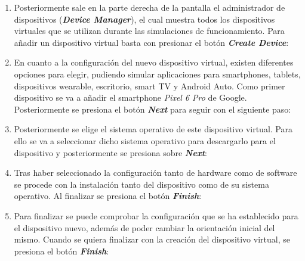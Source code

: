 \begin{enumerate}
        \item Posteriormente sale en la parte derecha de la pantalla el administrador de dispositivos (\textit{\textbf{Device Manager}}), el cual muestra todos los dispositivos virtuales que se utilizan durante las simulaciones de funcionamiento. Para añadir un dispositivo virtual basta con presionar el botón \textit{\textbf{Create Device}}:
        \item En cuanto a la configuración del nuevo dispositivo virtual, existen diferentes opciones para elegir, pudiendo simular aplicaciones para smartphones, tablets, dispositivos wearable, escritorio, smart TV y Android Auto. Como primer dispositivo se va a añadir el smartphone \textit{Pixel 6 Pro} de Google. Posteriormente se presiona el botón \textit{\textbf{Next}} para seguir con el siguiente paso:
        \item Posteriormente se elige el sistema operativo de este dispositivo virtual. Para ello se va a seleccionar dicho sistema operativo para descargarlo para el dispositivo y posteriormente se presiona sobre \textbf{\textit{Next}}:
        \item Tras haber seleccionado la configuración tanto de hardware como de software se procede con la instalación tanto del dispositivo como de su sistema operativo. Al finalizar se presiona el botón \textit{\textbf{Finish}}:
        \item Para finalizar se puede comprobar la configuración que se ha establecido para el dispositivo nuevo, además de poder cambiar la orientación inicial del mismo. Cuando se quiera finalizar con la creación del dispositivo virtual, se presiona el botón \textit{\textbf{Finish}}:
    \end{enumerate}
   
